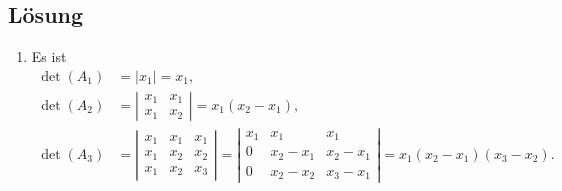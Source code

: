 \subsection{Lösung}
\begin{enumerate}
	\item Es ist 
	\begin{align*}
		\det(A_1) &= |x_1| = x_1\text{,} \\
		\det(A_2) &= \left| \begin{smallmatrix}
			x_1 & x_1 \\
			x_1 & x_2
		\end{smallmatrix} \right| = x_1(x_2-x_1)\text{,} \\
		\det(A_3) &= \left| \begin{smallmatrix}
			x_1 & x_1 & x_1 \\
			x_1 & x_2 & x_2 \\
			x_1 & x_2 & x_3
		\end{smallmatrix} \right| = \left| \begin{smallmatrix}
			x_1 & x_1 & x_1 \\
			0 & x_2-x_1 & x_2-x_1 \\
			0 & x_2-x_2 & x_3-x_1
		\end{smallmatrix} \right| = x_1(x_2-x_1)(x_3-x_2)\text{.}
	\end{align*}


\end{enumerate}
